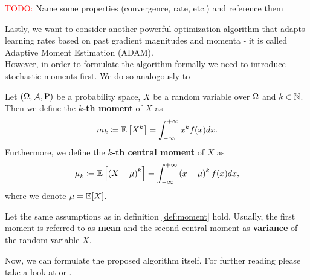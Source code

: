 \textcolor{red}{TODO:} Name some properties (convergence, rate, etc.) and reference them

Lastly, we want to consider another powerful optimization algorithm that adapts learning rates based on past gradient magnitudes and momenta - it is called \glqq Adaptive Moment Estimation (ADAM)\grqq{}.\\
However, in order to formulate the algorithm formally we need to introduce stochastic moments first. We do so analogously to \cite[chapter~5]{edition2002probability}

\begin{definition}\label{def:moment}
Let $(\Omega,\operatorname{\mathcal{A}},\operatorname{\text{P}})$ be a probability space, $X$ be a random variable over $\Omega$ and $k\in\operatorname{\mathbb{N}}$. Then we define the $k$\textbf{-th moment} of $X$ as
\begin{align*}
m_k \coloneqq \operatorname{\mathbb{E}} \left[X^k \right] = \int_{-\infty}^{+\infty} x^k f(x) dx.
\end{align*}
Furthermore, we define the $k$\textbf{-th central moment} of $X$ as
\begin{align*}
\operatorname{\mu}_k \coloneqq \operatorname{\mathbb{E}} \left[\left(X - \operatorname{\mu} \right)^k \right] = \int_{-\infty}^{+\infty} \left(x - \operatorname{\mu}\right)^k f(x) dx,
\end{align*}
where we denote $\operatorname{\mu}=\operatorname{\mathbb{E}}[X]$.
\end{definition}


\begin{remark}
Let the same assumptions as in definition \ref{def:moment} hold. Usually, the first moment is referred to as \textbf{mean} and the second central moment as \textbf{variance} of the random variable $X$.
\end{remark}

Now, we can formulate the proposed algorithm itself. For further reading please take a look at \cite{kingma2014adam} or \cite[chapter~8]{goodfellow2016deep}.

